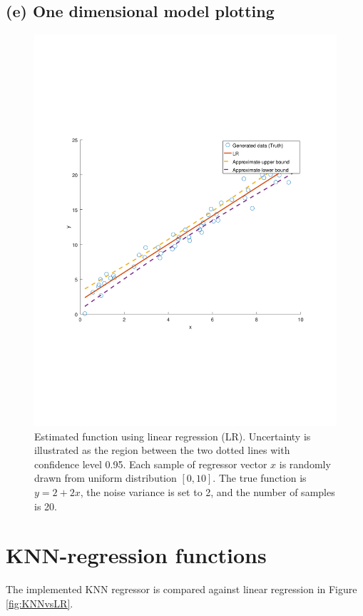 \documentclass[]{article}
\begin{document}
\subsection{(e) One dimensional model plotting}
\begin{figure}[H]
	\centering
	\includegraphics[trim= 10cm 5cm 10cm 5cm, scale=0.4]{proj1-1e}
	\caption{Estimated function using linear regression (LR). Uncertainty is illustrated as the region between the two dotted lines with confidence level 0.95. Each sample of regressor vector $x$ is randomly drawn from uniform distribution $[0,10]$. The true function is $y=2+2x$, the noise variance is set to 2, and the number of samples is 20. }
	\label{fig:confidence}
\end{figure}

\section{KNN-regression functions}
The implemented KNN regressor is compared against linear regression in Figure \ref{fig:KNNvsLR}.
\end{document}
